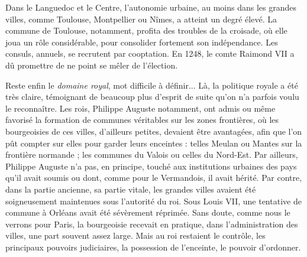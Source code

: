 \documentclass[french,twoside]{book} %
\begin{document}
Dans le Languedoc et le Centre, l’autonomie urbaine, au moins dans les grandes villes, comme Toulouse, Montpellier ou Nîmes, a atteint un degré élevé. La commune de Toulouse, notamment, profita des troubles de la croisade, où elle joua un rôle considérable, pour consolider fortement son indépendance. Les consuls, annuels, se recrutent par cooptation. En 1248, le comte Raimond VII a dû promettre de ne point se mêler de l’élection.\par
Reste enfin le \emph{domaine royal}, mot difficile à définir... Là, la politique royale a été très claire, témoignant de beaucoup plus d’esprit de suite qu’on n’a parfois voulu le reconnaître. Les rois, Philippe Auguste notamment, ont admis ou même favorisé la formation de communes véritables sur les zones frontières, où les bourgeoisies de ces villes, d’ailleurs petites, devaient être avantagées, afin que l’on pût compter sur elles pour garder leurs enceintes : telles Meulan ou Mantes sur la frontière normande ; les communes du Valois ou celles du Nord-Est. Par ailleurs, Philippe Auguste n’a pas, en principe, touché aux institutions urbaines des pays qu’il avait soumis ou dont, comme pour le Vermandois, il avait hérité. Par contre, dans la partie ancienne, sa partie vitale, les grandes villes avaient été soigneusement maintenues sous l’autorité du roi. Sous Louis VII, une tentative de commune à Orléans avait été sévèrement réprimée. Sans doute, comme nous le verrons pour Paris, la bourgeoisie recevait en pratique, dans l’administration des villes, une part souvent assez large. Mais au roi restaient le contrôle, les principaux pouvoirs judiciaires, la possession de l’enceinte, le pouvoir d’ordonner.
\end{document}
